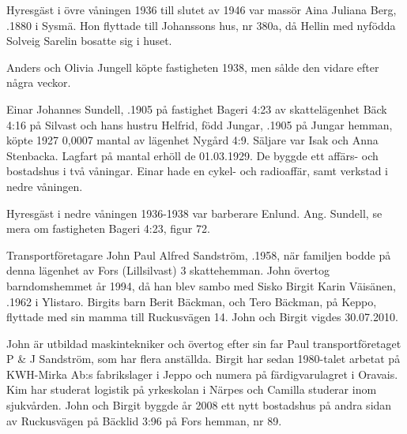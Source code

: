 Hyresgäst i övre våningen 1936 till slutet av 1946 var massör	Aina Juliana Berg, .1880 i Sysmä. Hon flyttade till Johanssons hus, nr 380a, då Hellin med nyfödda Solveig Sarelin bosatte sig i huset.


%
Anders och Olivia Jungell köpte fastigheten 1938, men sålde den vidare efter några veckor.\jhvspace{}


%
Einar Johannes Sundell, .1905 på fastighet Bageri 4:23 av 	skattelägenhet Bäck 4:16 på Silvast och hans hustru Helfrid, född Jungar, .1905 på Jungar hemman, köpte 1927 0,0007 mantal av lägenhet Nygård 4:9. Säljare var Isak och Anna Stenbacka. Lagfart på mantal erhöll de 01.03.1929. De byggde ett affärs- och bostadshus i två våningar. Einar hade en cykel- och radioaffär, samt verkstad i nedre våningen.

Hyresgäst i nedre våningen 1936-1938 var barberare Enlund.
Ang. Sundell, se mera om fastigheten Bageri 4:23, figur 72.



%



%
Transportföretagare John Paul Alfred Sandström, .1958, när familjen bodde på denna lägenhet av Fors (Lillsilvast) 3 skattehemman. John övertog barndomshemmet år 1994, då han blev sambo med Sisko Birgit Karin Väisänen, .1962 i Ylistaro. Birgits barn Berit Bäckman,  och Tero Bäckman,  på Keppo, flyttade med sin mamma till Ruckusvägen 14. John och Birgit vigdes 30.07.2010.
\begin{jhchildren}
  \item {}
  \item {}
\end{jhchildren}

John är utbildad maskintekniker och övertog efter sin far Paul transportföretaget P \& J Sandström, som har flera anställda. Birgit har sedan 1980-talet arbetat på KWH-Mirka Ab:s fabrikslager i Jeppo och numera på färdigvarulagret i Oravais. Kim har studerat logistik på yrkeskolan i Närpes och Camilla studerar inom sjukvården. John och Birgit byggde år 2008 ett nytt bostadshus på andra sidan av Ruckusvägen på Bäcklid 3:96 på Fors hemman, nr 89.


